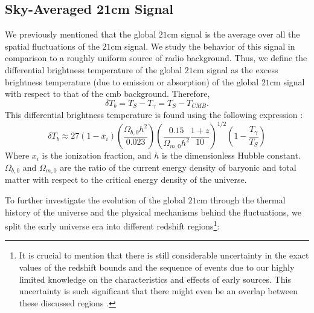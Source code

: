 \documentclass[12pt, TexShade, letterpaper]{report}
\begin{document}
\subsection{Sky-Averaged 21cm Signal}
\label{chap:global21cm,sub:physics,sub:global}
We previously mentioned that the global $\mathrm{21cm}$ signal is the average over all the spatial fluctuations of the $\mathrm{21cm}$ signal. We study the behavior of this signal in comparison to a roughly uniform source of radio background. Thus, we define the differential brightness temperature of the global $\mathrm{21cm}$ signal as the excess brightness temperature (due to emission or absorption) of the global $\mathrm{21cm}$ signal with respect to that of the \gls{cmb} background. Therefore,
\begin{equation}
    \delta T_b = T_{S} - T_{\gamma} = T_S - T_{CMB}.
\end{equation}
This differential brightness temperature is found using the following expression \cite{low_frequency}:
\begin{equation}
    \delta T_b \approx 27 \left(1- \bar{x}_i\right) \left(\frac{\Omega_{b, 0}h^2}{0.023}\right) \left( \frac{0.15}{\Omega_{m, 0}h^2} \frac{1+z}{10}\right)^{1/2}\left(1-\frac{T_\gamma}{T_S}\right)
    \label{eq:global_curve}
\end{equation}
Where $x_i$ is the ionization fraction, and $h$ is the dimensionless Hubble constant. $\Omega_{b, 0}$ and $\Omega_{m, 0}$ are the ratio of the current energy density of baryonic and total matter with respect to the critical energy density of the universe.\par
To further investigate the evolution of the global $\mathrm{21cm}$ through the thermal history of the universe and the physical mechanisms behind the fluctuations, we split the early universe era into different redshift regions\footnote{It is crucial to mention that there is still considerable uncertainty in the exact values of the redshift bounds and the sequence of events due to our highly limited knowledge on the characteristics and effects of early sources. This uncertainty is such significant that there might even be an overlap between these discussed regions \cite{21century}.}:\par
\end{document}
